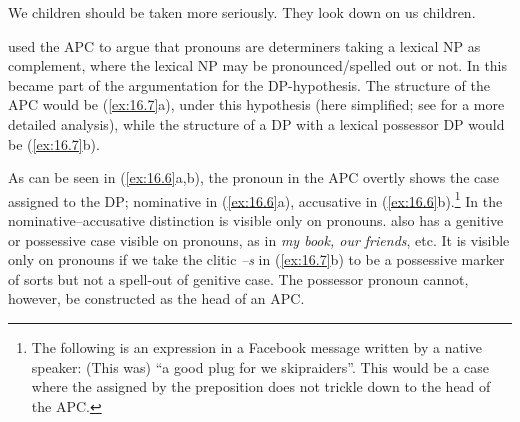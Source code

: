 \documentclass[output=paper]{langsci/langscibook}
\begin{document}
\ea\label{ex:16.6}
	\ea We children should be taken more seriously.
	\ex They look down on us children.
	\z
\z

\citet{Postal1969} used the \gls{APC} to
argue that pronouns are determiners taking a lexical NP as complement, where
the lexical NP may be pronounced/spelled out or not. In \citet{Abney1987} this
became part of the argumentation for the DP-hypothesis. The structure of the
\gls{APC} would be (\ref{ex:16.7}a),
under this hypothesis (here simplified; see \citealt{Hoehn2017} for a more
detailed analysis), while the structure of a DP with a lexical possessor DP
would be (\ref{ex:16.7}b).

\ea\label{ex:16.7}
    \begin{multicols}{2}\raggedcolumns\ea
    \columnbreak
    \ex
    \z\end{multicols}
\z

As can be seen in (\ref{ex:16.6}a,b), the pronoun in the
\gls{APC} overtly shows the case assigned to
the DP; nominative in (\ref{ex:16.6}a), accusative in
(\ref{ex:16.6}b).\footnote{The following is an expression in a Facebook
    message written by a native  speaker:  (This was) “a good plug
    for we skipraiders”.  This would be a case where the 
    assigned by the preposition does not trickle down to the  head of the
\gls{APC}.\label{fn:16.2}} In 
the nomina\-tive--accusative distinction is visible only on pronouns.
 also has a genitive or possessive case visible
on pronouns, as in \emph{my book, our friends}, etc. It is visible only on
pronouns if we take the clitic \emph{–s} in (\ref{ex:16.7}b) to be a
possessive marker of sorts but not a spell-out of genitive case. The possessor
pronoun cannot, however, be constructed as the head of an APC.
\end{document}
